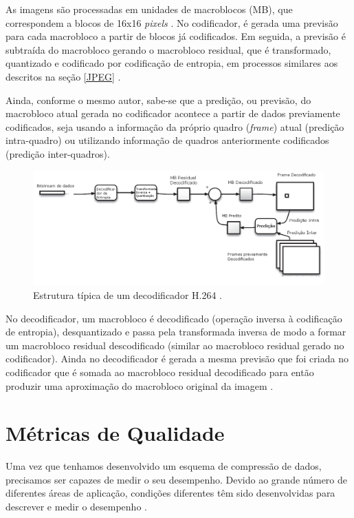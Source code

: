 As imagens são processadas em unidades de macroblocos (MB), que correspondem a blocos de 16x16 \textit{pixels} \cite{richardson2011h}. No codificador, é gerada uma previsão para cada macrobloco a partir de blocos já codificados. Em seguida, a previsão é subtraída do macrobloco gerando o macrobloco residual, que é transformado, quantizado e codificado por codificação de entropia, em processos similares aos descritos na seção \ref{JPEG} .

Ainda, conforme o mesmo autor, sabe-se que a predição, ou previsão, do macrobloco atual gerada no codificador acontece a partir de dados previamente codificados, seja usando a informação da próprio quadro (\textit{frame}) atual (predição intra-quadro) ou utilizando informação de quadros anteriormente codificados (predição inter-quadros).
  
\begin{figure}[h]
	\centering
	\includegraphics[scale=0.45]{figuras/H264_DECODIFICADOR.png}
	\caption{Estrutura típica de um decodificador H.264 \cite{richardson2011h}.}
	\label{H264_DECODER}
\end{figure}

No decodificador, um macrobloco é decodificado (operação inversa à codificação de entropia), desquantizado e passa pela transformada inversa de modo a formar um macrobloco residual descodificado (similar ao macrobloco residual gerado no codificador). Ainda no decodificador é gerada a mesma previsão que foi criada no codificador que é somada ao macrobloco residual decodificado para então produzir uma aproximação do macrobloco original da imagem \cite{richardson2011h}.

\section{Métricas de Qualidade}
Uma vez que tenhamos desenvolvido um esquema de compressão de dados, precisamos ser capazes de medir o seu desempenho. Devido ao grande número de diferentes áreas de aplicação, condições diferentes têm sido desenvolvidas para descrever e medir o desempenho \cite{sayood2012introduction}.

